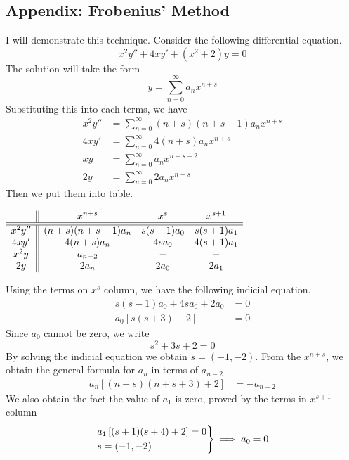 \documentclass[../../main.tex]{subfiles}
\begin{document}
\subsection*{Appendix: Frobenius' Method}
I will demonstrate this technique. Consider the following differential equation.
\begin{equation*}
  x^2 y''+ 4xy' + (x^2 + 2)y = 0
\end{equation*}
The solution will take the form 
\begin{equation*}
  y=\sum_{n=0}^{\infty} a_nx^{n+s}
\end{equation*}
Substituting this into each terms, we have 
\begin{align*}
  x^2y''&=\sum_{n=0}^{\infty} (n+s) (n+s-1)a_nx^{n+s} \\
  4xy'&=\sum_{n=0}^{\infty} 4(n+s) a_nx^{n+s}\\
  xy&=\sum_{n=0}^{\infty} a_n x^{n+s+2}\\
  2y&=\sum_{n=0}^{\infty} 2a_nx^{n+s}
\end{align*}
Then we put them into table.
\begin{center}
$\begin{array}{c || c c c}
  &x^{n+s}&x^s&x^{s+1}\\
  \hline\hline
  x^2y''&(n + s)(n + s - 1)a_n &s(s-1)a_0  &s(s+1)a_1 \\
  4xy'&4(n+s)a_n &4sa_0 &4(s+1)a_1 \\
  x^2y&a_{n-2} &-&- \\
  2y& 2a_n& 2a_0& 2a_1\\
\end{array}$
\end{center}
Using the terms on $x^{s}$ column, we have the following indicial equation.
\begin{align*}
  s(s-1)a_0+4sa_0+2a_0&=0\\
  a_0 \left[s(s+3)+2 \right] &=0
\end{align*}
Since $a_0$ cannot be zero, we write 
\begin{equation*}
  s^2+3s+2 =0
\end{equation*}
By solving the indicial equation we obtain $s=(-1,-2)$. From the $x^{n+s}$, we obtain the general formula for $a_n$ in terms of $a_{n-2}$
\begin{align*}
  a_n\left[(n+s)(n+s+3)+2\right]&=-a_{n-2}
\end{align*}
We also obtain the fact the value of $a_1$ is zero, proved by the terms in $x^{s+1}$ column 
\begin{equation*}
  \begin{rcases*}
    a_1\left[(s+1)(s+4)+2\right]=0\\
    s=(-1,-2)
  \end{rcases*}\implies a_0=0
\end{equation*}
\end{document}
